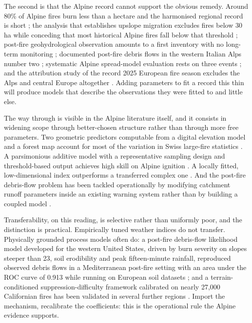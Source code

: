 \documentclass[11pt,a4paper]{article}
\begin{document}
The second is that the Alpine record cannot support the obvious remedy. Around 80\% of Alpine fires burn less than a hectare and the harmonised regional record is short \citep{muller_forest_2020}; the analysis that establishes upslope migration excludes fires below 30\,ha while conceding that most historical Alpine fires fall below that threshold \citep{beloiu_climatedriven_2026}; post-fire geohydrological observation amounts to a first inventory with no long-term monitoring \citep{melzner_wildfire-induced_2025}; documented post-fire debris flows in the western Italian Alps number two \citep{tiranti_wildfires_2021}; systematic Alpine spread-model evaluation rests on three events \citep{malanchini_modeling_2025}; and the attribution study of the record 2025 European fire season excludes the Alps and central Europe altogether \citep{keeping_attribution_2026}. Adding parameters to fit a record this thin will produce models that describe the observations they were fitted to and little else.

The way through is visible in the Alpine literature itself, and it consists in widening scope through better-chosen structure rather than through more free parameters. Two geometric predictors computable from a digital elevation model and a forest map account for most of the variation in Swiss large-fire statistics \citep{conedera_linking_2024}. A parsimonious additive model with a representative sampling design and threshold-based output achieves high skill on Alpine ignition \citep{moreno_1_nodate}. A locally fitted, low-dimensional index outperforms a transferred complex one \citep{de_angelis_modelling_2015}. And the post-fire debris-flow problem has been tackled operationally by modifying catchment runoff parameters inside an existing warning system rather than by building a coupled model \citep{tiranti_wildfires_2021}.

Transferability, on this reading, is selective rather than uniformly poor, and the distinction is practical. Empirically tuned weather indices do not transfer. Physically grounded process models often do: a post-fire debris-flow likelihood model developed for the western United States, driven by burn severity on slopes steeper than 23\degree{}, soil erodibility and peak fifteen-minute rainfall, reproduced observed debris flows in a Mediterranean post-fire setting with an area under the ROC curve of 0.913 while running on European soil datasets \citep{diakakis_exploring_2023}; and a terrain-conditioned suppression-difficulty framework calibrated on nearly 27{,}000 Californian fires has been validated in several further regions \citep{cardil_assessing_2025}. Import the mechanism, recalibrate the coefficients: this is the operational rule the Alpine evidence supports.
\end{document}

